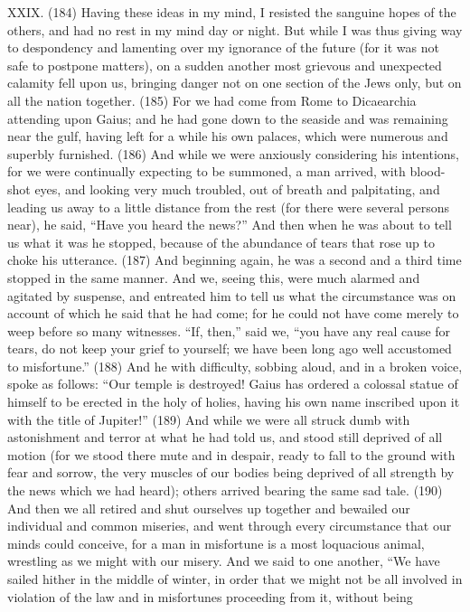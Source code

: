 XXIX. (184) Having these ideas in my mind, I resisted the sanguine hopes of the others, and had
no rest in my mind day or night. But while I was thus giving way to despondency and lamenting over
my ignorance of the future (for it was not safe to postpone matters), on a sudden another most
grievous and unexpected calamity fell upon us, bringing danger not on one section of the Jews
only, but on all the nation together. (185) For we had come from Rome to Dicaearchia attending
upon Gaius; and he had gone down to the seaside and was remaining near the gulf, having left for
a while his own palaces, which were numerous and superbly furnished. (186) And while we were
anxiously considering his intentions, for we were continually expecting to be summoned, a man
arrived, with blood-shot eyes, and looking very much troubled, out of breath and palpitating, and
leading us away to a little distance from the rest (for there were several persons near), he said,
``Have you heard the news?'' And then when he was about to tell us what it was he stopped,
because of the abundance of tears that rose up to choke his utterance. (187) And beginning again,
he was a second and a third time stopped in the same manner. And we, seeing this, were much
alarmed and agitated by suspense, and entreated him to tell us what the circumstance was on
account of which he said that he had come; for he could not have come merely to weep before so
many witnesses. ``If, then,'' said we, ``you have any real cause for tears, do not keep your grief to
yourself; we have been long ago well accustomed to misfortune.'' (188) And he with difficulty,
sobbing aloud, and in a broken voice, spoke as follows: ``Our temple is destroyed! Gaius has
ordered a colossal statue of himself to be erected in the holy of holies, having his own name
inscribed upon it with the title of Jupiter!'' (189) And while we were all struck dumb with
astonishment and terror at what he had told us, and stood still deprived of all motion (for we stood
there mute and in despair, ready to fall to the ground with fear and sorrow, the very muscles of our
bodies being deprived of all strength by the news which we had heard); others arrived bearing the
same sad tale. (190) And then we all retired and shut ourselves up together and bewailed our
individual and common miseries, and went through every circumstance that our minds could
conceive, for a man in misfortune is a most loquacious animal, wrestling as we might with our
misery. And we said to one another, ``We have sailed hither in the middle of winter, in order that we
might not be all involved in violation of the law and in misfortunes proceeding from it, without being
